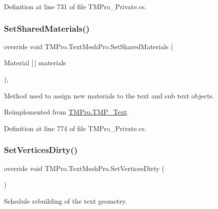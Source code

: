 Definition at line 731 of file T\+M\+Pro\+\_\+\+Private.\+cs.

\mbox{\label{class_t_m_pro_1_1_text_mesh_pro_a3d7d7fcab89d108d86a0bb463604267d}} 
\subsubsection{\texorpdfstring{SetSharedMaterials()}{SetSharedMaterials()}}
{\footnotesize\ttfamily override void T\+M\+Pro.\+Text\+Mesh\+Pro.\+Set\+Shared\+Materials (\begin{DoxyParamCaption}\item[{Material \mbox{[}$\,$\mbox{]}}]{materials }\end{DoxyParamCaption})\hspace{0.3cm}{\ttfamily [protected]}, {\ttfamily [virtual]}}



Method used to assign new materials to the text and sub text objects. 



Reimplemented from \mbox{\hyperlink{class_t_m_pro_1_1_t_m_p___text_abd5a99f8e985bc1808f4dee6b268c7e1}{T\+M\+Pro.\+T\+M\+P\+\_\+\+Text}}.



Definition at line 774 of file T\+M\+Pro\+\_\+\+Private.\+cs.

\mbox{\label{class_t_m_pro_1_1_text_mesh_pro_a8ca7b09fd7f2319069c84e72c0db0fa8}} 
\subsubsection{\texorpdfstring{SetVerticesDirty()}{SetVerticesDirty()}}
{\footnotesize\ttfamily override void T\+M\+Pro.\+Text\+Mesh\+Pro.\+Set\+Vertices\+Dirty (\begin{DoxyParamCaption}{ }\end{DoxyParamCaption})}



Schedule rebuilding of the text geometry. 



